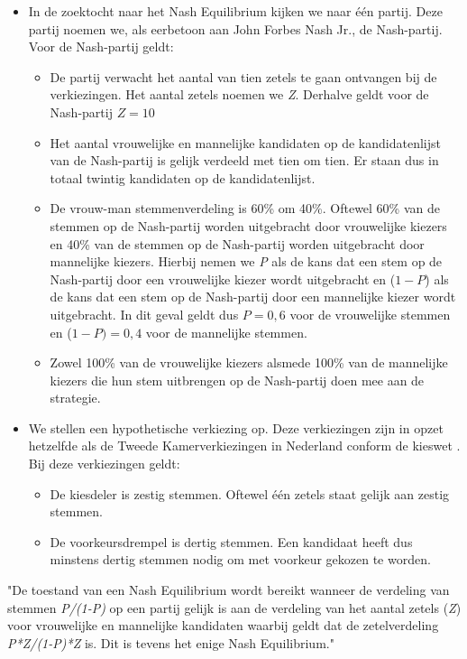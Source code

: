 \begin{itemize}
	\item
In de zoektocht naar het Nash Equilibrium kijken we naar één partij. Deze partij noemen we, als eerbetoon aan John Forbes Nash Jr., de Nash-partij. Voor de Nash-partij geldt:
		\begin{itemize}
			\item
			De partij verwacht het aantal van tien zetels te gaan ontvangen bij de verkiezingen. Het aantal zetels noemen we \textit{Z}. Derhalve geldt voor de Nash-partij $Z=10$
			\item
			Het aantal vrouwelijke en mannelijke kandidaten op de kandidatenlijst van de Nash-partij is gelijk verdeeld met tien om tien. Er staan dus in totaal twintig kandidaten op de kandidatenlijst. 
			\item
			De vrouw-man stemmenverdeling is 60\% om 40\%. Oftewel 60\% van de stemmen op de Nash-partij worden uitgebracht door vrouwelijke kiezers en 40\% van de stemmen op de Nash-partij worden uitgebracht door mannelijke kiezers. Hierbij nemen we \textit{P} als de kans dat een stem op de Nash-partij door een vrouwelijke kiezer wordt uitgebracht en ($1-P$) als de kans dat een stem op de Nash-partij door een mannelijke kiezer wordt uitgebracht. In dit geval geldt dus $P=0,6$ voor de vrouwelijke stemmen en ($1-P)=0,4$ voor de mannelijke stemmen.
			\item
			Zowel 100\% van de vrouwelijke kiezers alsmede 100\% van de mannelijke kiezers die hun stem uitbrengen op de Nash-partij doen mee aan de strategie.
		\end{itemize}
	\item
We stellen een hypothetische verkiezing op. Deze verkiezingen zijn in opzet hetzelfde als de Tweede Kamerverkiezingen in Nederland conform de kieswet \citeyearpar{kieswetje}. Bij deze verkiezingen geldt:
		\begin{itemize}
			\item 
		De kiesdeler is zestig stemmen. Oftewel één zetels staat gelijk aan zestig stemmen.
		\item
		De voorkeursdrempel is dertig stemmen. Een kandidaat heeft dus minstens dertig stemmen nodig om met voorkeur gekozen te worden.
		\end{itemize}
\end{itemize}

\begin{theorem} "De toestand van een Nash Equilibrium wordt bereikt wanneer de verdeling van stemmen \textit{P/(1-P)} op een partij gelijk is aan de verdeling van het aantal zetels (\textit{Z}) voor vrouwelijke en mannelijke kandidaten waarbij geldt dat de zetelverdeling \textit{P*Z/(1-P)*Z} is. Dit is tevens het enige Nash Equilibrium." \\
\end{theorem}

